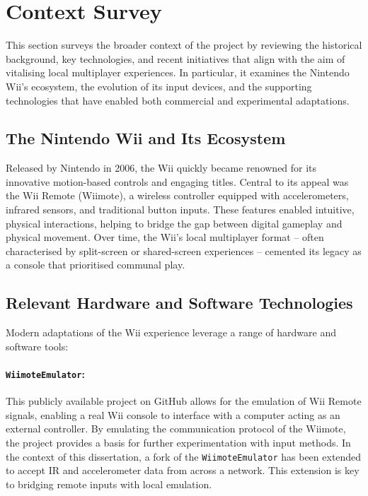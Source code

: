 \chapter{Context Survey}
\label{chapter:context}

This section surveys the broader context of the project by reviewing the historical background, key technologies, and recent initiatives that align with the aim of vitalising local multiplayer experiences. In particular, it examines the Nintendo Wii’s ecosystem, the evolution of its input devices, and the supporting technologies that have enabled both commercial and experimental adaptations.

\section{The Nintendo Wii and Its Ecosystem}
Released by Nintendo in 2006, the Wii quickly became renowned for its innovative motion-based controls and engaging titles. Central to its appeal was the Wii Remote (Wiimote), a wireless controller equipped with accelerometers, infrared sensors, and traditional button inputs. These features enabled intuitive, physical interactions, helping to bridge the gap between digital gameplay and physical movement. Over time, the Wii’s local multiplayer format -- often characterised by split-screen or shared-screen experiences -- cemented its legacy as a console that prioritised communal play.

\section{Relevant Hardware and Software Technologies}
Modern adaptations of the Wii experience leverage a range of hardware and software tools:

\subsubsection{\texttt{WiimoteEmulator}\cite{wiimote_emulator}:} This publicly available project on GitHub allows for the emulation of Wii Remote signals, enabling a real Wii console to interface with a computer acting as an external controller. By emulating the communication protocol of the Wiimote, the project provides a basis for further experimentation with input methods. In the context of this dissertation, a fork of the \texttt{WiimoteEmulator} has been extended to accept IR and accelerometer data from across a network. This extension is key to bridging remote inputs with local emulation.

